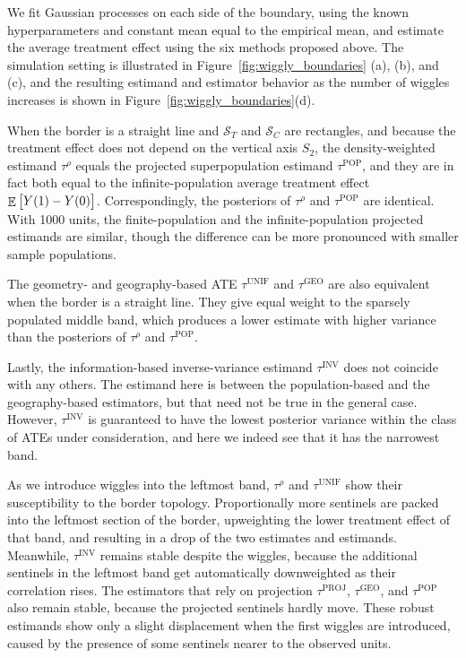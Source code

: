 \documentclass[letter]{article}
\DeclareMathOperator{\E}{\mathbb{E}}
\newcommand{\scrS}{\mathscr{S}}
\newcommand{\unifavg}{\tau^{\mathrm{UNIF}}}
\newcommand{\invvar}{\tau^{\mathrm{INV}}}
\newcommand{\taurho}{\tau^{\rho}}
\newcommand{\tauproj}{\tau^{\mathrm{PROJ}}}
\newcommand{\taugeo}{\tau^{\mathrm{GEO}}}
\newcommand{\taupop}{\tau^{\mathrm{POP}}}
\begin{document}
    	We fit Gaussian processes on each side of the boundary,
using the known hyperparameters and constant mean equal to the empirical mean,
and estimate the average treatment effect using the six methods proposed above.
The simulation setting is illustrated in Figure~\ref{fig:wiggly_boundaries} (a), (b), and (c),
and the resulting estimand and estimator behavior as the number of wiggles increases is shown in Figure~\ref{fig:wiggly_boundaries}(d).

When the border is a straight line and \(\scrS_T\) and \(\scrS_C\) are rectangles,
and because the treatment effect does not depend on the vertical axis \(S_2\),
the density-weighted estimand \(\taurho\) equals the projected superpopulation estimand \(\taupop\),
and they are in fact both equal to the infinite-population average treatment effect \(\E\sbr{Y(1)-Y(0)}\).
Correspondingly, the posteriors of \(\taurho\) and \(\taupop\) are identical.
With 1000 units, the finite-population and the infinite-population projected estimands are similar, though the difference can be more pronounced with smaller sample populations.

The geometry- and geography-based ATE \(\unifavg\) and \(\taugeo\) are also equivalent when the border is a straight line.
They give equal weight to the sparsely populated middle band, which produces a lower estimate with higher variance than the posteriors of \(\taurho\) and \(\taupop\).

Lastly, the information-based inverse-variance estimand \(\invvar\) does not coincide with any others.
The estimand here is between the population-based and the geography-based estimators, but that need not be true in the general case.
However, \(\invvar\) is guaranteed to have the lowest posterior variance within the class of ATEs under consideration, and here we indeed see that it has the narrowest band.

As we introduce wiggles into the leftmost band,
\(\taurho\) and \(\unifavg\) show their susceptibility to the border topology.
Proportionally more sentinels are packed into the leftmost section of the border,
upweighting the lower treatment effect of that band,
and resulting in a drop of the two estimates and estimands.
Meanwhile, \(\invvar\) remains stable despite the wiggles,
because the additional sentinels in the leftmost
band get automatically downweighted as their correlation rises.
The estimators that rely on projection
\(\tauproj\), \(\taugeo\), and \(\taupop\) also remain stable,
because the projected sentinels hardly move.
These robust estimands show only a slight displacement when the first wiggles are introduced,
caused by the presence of some sentinels nearer to the observed units.
\end{document}
